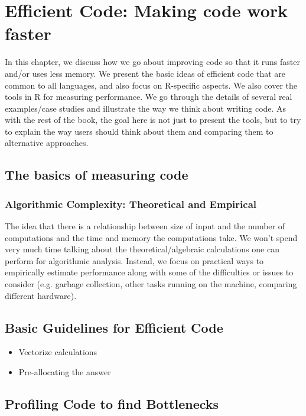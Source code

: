 \chapter{Efficient Code: Making code work faster}
\begin{summary}
In this chapter, we discuss how we go about improving code so that it
runs faster and/or uses less memory.  We present the basic ideas of
efficient code that are common to all languages, and also focus on
R-specific aspects.  We also cover the tools in R for measuring
performance. We go through the details of several real examples/case
studies and illustrate the way we think about writing code.  As with
the rest of the book, the goal here is not just to present the tools,
but to try to explain the way users should think about them and
comparing them to alternative approaches.
\end{summary}

\section{The basics of measuring code}

\subsection{Algorithmic Complexity: Theoretical and Empirical}
The idea that there is a relationship between size of input and the
number of computations and the time and memory the computations take. 
We won't spend very much time talking about the theoretical/algebraic
calculations one can perform for algorithmic analysis.
Instead, we focus  on practical ways to empirically estimate 
performance along with some of the difficulties or issues to 
consider (e.g. garbage collection, other tasks running on the machine,
comparing different hardware).


\section{Basic Guidelines for Efficient Code}

\begin{itemize}
\item  Vectorize calculations
\item  Pre-allocating the answer
\end{itemize}

\section{Profiling Code to find Bottlenecks}

